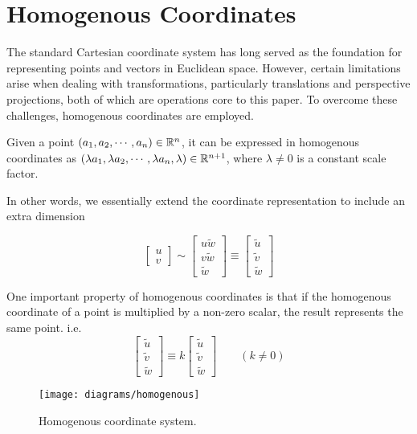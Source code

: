 \clearpage
\section{Homogenous Coordinates} \label{sec:homogenous}

The standard Cartesian coordinate system has long served as the foundation for representing points and vectors in Euclidean space. However, certain limitations arise when dealing with transformations, particularly translations and perspective projections, both of which are operations core to this paper. To overcome these challenges, homogenous coordinates are employed.

\begin{definition}
    Given a point $(a_1, a_2, \cdots, a_n) \in \mathbb{R}^n$, it can be expressed in homogenous coordinates as $(\lambda a_1, \lambda a_2, \cdots, \lambda a_n, \lambda) \in \mathbb{R}^{n+1}$, where $\lambda \neq 0$ is a constant scale factor. 
\end{definition}

In other words, we essentially extend the coordinate representation to include an extra dimension

\begin{equation}
    \begin{bmatrix}
        u \\ v 
    \end{bmatrix}
    \sim
    \begin{bmatrix}
        u\widetilde{w} \\ v\widetilde{w} \\ \widetilde{w}
    \end{bmatrix}
    \equiv
    \begin{bmatrix}
        \widetilde{u} \\ \widetilde{v} \\ \widetilde{w}
    \end{bmatrix}
\end{equation}

One important property of homogenous coordinates is that if the homogenous coordinate of a point is multiplied by a non-zero scalar, the result represents the same point. i.e.
\begin{equation}
    \begin{bmatrix}
        \widetilde{u} \\ \widetilde{v} \\ \widetilde{w}
    \end{bmatrix}
    \equiv
    k
    \begin{bmatrix}
        \widetilde{u} \\ \widetilde{v} \\ \widetilde{w}
    \end{bmatrix}
    \qquad (k \neq 0)
\end{equation}

\begin{figure}[H]
    \centering
    \texttt{[image: diagrams/homogenous]}
    \caption{Homogenous coordinate system.}
\end{figure}
